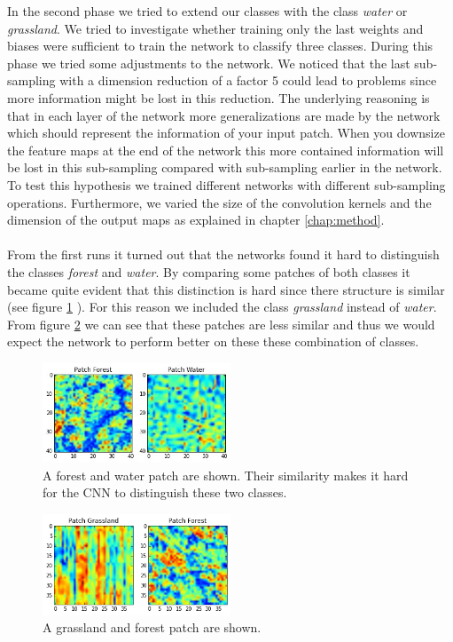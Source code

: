 \documentclass[a4paper,onecolumn]{report}
\begin{document}
In the second phase we tried to extend our classes with the class \textit{water} or \textit{grassland}. We tried to investigate whether training only the last weights and biases were sufficient to train the network to classify three classes. During this phase we tried some adjustments to the network. We noticed that the last sub-sampling with a dimension reduction of a factor 5 could lead to problems since more information might be lost in this reduction. The underlying reasoning is that in each layer of the network more generalizations are made by the network which should represent the information of your input patch. When you downsize the feature maps at the end of the network this more contained information will be lost in this sub-sampling compared with sub-sampling earlier in the network. To test this hypothesis we trained different networks with different sub-sampling operations. Furthermore, we varied the size of the convolution kernels and the dimension of the output maps as explained in chapter \ref{chap:method}.
\\\\
From the first runs it turned out that the networks found it hard to distinguish the classes \textit{forest} and \textit{water}. By comparing some patches of both classes it became quite evident that this distinction is hard since there structure is similar (see figure \ref{fig:WaterForestPatch} ). For this reason we included the class \textit{grassland} instead of \textit{water}. From figure \ref{fig:GrassForestPatch} we can see that these patches are less similar and thus we would expect the network to perform better on these these combination of classes.


\begin{figure}[bth]
	\centering
	\includegraphics[width=0.5\textwidth]{./images/WaterForestPatch.jpg}
	\caption{A forest and water patch are shown. Their similarity makes it hard for the CNN to distinguish these two classes.}
	\label{fig:WaterForestPatch}
\end{figure}
\begin{figure}[bth]
	\centering
	\includegraphics[width=0.5\textwidth]{./images/GrassForestPatch.jpg}
	\caption{A grassland and forest patch are shown.}
	\label{fig:GrassForestPatch}
\end{figure}
\end{document}
